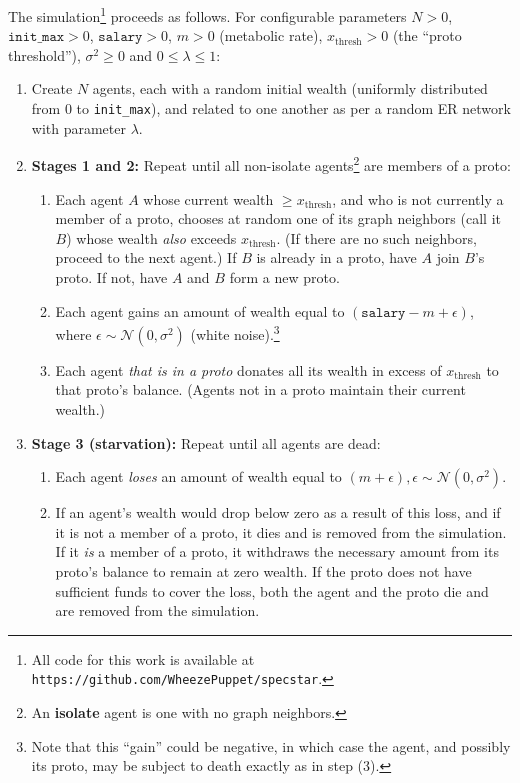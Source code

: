 The simulation\footnote{All code for this work is available at \texttt{https://github.com/WheezePuppet/specstar}.} proceeds as follows. For configurable parameters
$N > 0$,
$\texttt{init\_max} > 0$,
$\texttt{salary} > 0$,
$m > 0$ (metabolic rate),
$x_{\textrm{thresh}} > 0$ (the ``proto threshold''),
$\sigma^2 \ge 0$ and
$0 \le \lambda \le 1$:

\begin{enumerate}
\itemsep.1em
\item Create $N$ agents, each with a random initial wealth (uniformly distributed from 0 to \texttt{init\_max}), and related to one another as per a random ER network with parameter $\lambda$.
\item \textbf{Stages 1 and 2:} Repeat until all non-isolate agents\footnote{An \textbf{isolate} agent is one with no graph neighbors.} are members of a proto:
    \begin{enumerate}
    \itemsep.1em
    \item Each agent $A$ whose current wealth $\ge x_{\textrm{thresh}}$, and who is not currently a member of a proto, chooses at random one of its graph neighbors (call it $B$) whose wealth \textit{also} exceeds $x_{\textrm{thresh}}$. (If there are no such neighbors, proceed to the next agent.) If $B$ is already in a proto, have $A$ join $B$'s proto. If not, have $A$ and $B$ form a new proto.
    \item Each agent gains an amount of wealth equal to $(\texttt{salary} - m + \epsilon)$, where $\epsilon \sim \mathcal{N}(0,\sigma^2)$ (white noise).\footnote{Note that this ``gain'' could be negative, in which case the agent, and possibly its proto, may be subject to death exactly as in step (3).}
    \item Each agent \textit{that is in a proto} donates all its wealth in excess of $x_{\textrm{thresh}}$ to that proto's balance. (Agents not in a proto maintain their current wealth.)
    \end{enumerate}
    \item \textbf{Stage 3 (starvation):} Repeat until all agents are dead:
        \begin{enumerate}
        \itemsep.1em
        \item Each agent \textit{loses} an amount of wealth equal to $(m + \epsilon), \epsilon \sim \mathcal{N}(0,\sigma^2)$.
        \item If an agent's wealth would drop below zero as a result of this loss, and if it is not a member of a proto, it dies and is removed from the simulation. If it \textit{is} a member of a proto, it withdraws the necessary amount from its proto's balance to remain at zero wealth. If the proto does not have sufficient funds to cover the loss, both the agent and the proto die and are removed from the simulation.
        \end{enumerate}
\end{enumerate}

